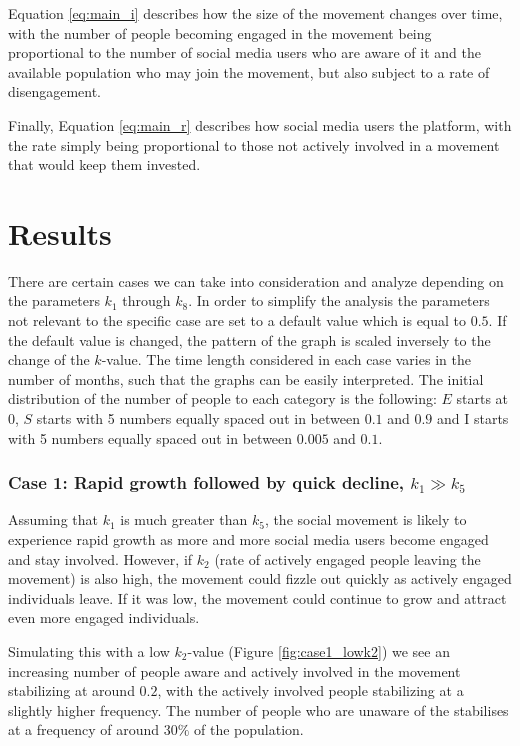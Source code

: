 \documentclass{article}
\begin{document}
    Equation \ref{eq:main_i} describes how the size of the movement changes over time, with the number of people becoming engaged in the movement being proportional to the number of social media users who are aware of it and the available population who may join the movement, but also subject to a rate of disengagement. 
    

    Finally, Equation \ref{eq:main_r} describes how social media users the platform, with the rate simply being proportional to those not actively involved in a movement that would keep them invested.
 

    \section{Results}
    
    There are certain cases we can take into consideration and analyze depending on the parameters $k_1$ through $k_8$. In order to simplify the analysis the parameters not relevant to the specific case are set to a default value which is equal to $0.5$. If the default value is changed, the pattern of the graph is scaled inversely to the change of the $k$-value.
    The time length considered in each case varies in the number of months, such that the graphs can be easily interpreted. The initial distribution of the number of people to each category is the following: $E$ starts at $0$, $S$ starts with 5 numbers equally spaced out in between $0.1$ and $0.9$ and I starts with 5 numbers equally spaced out in between $0.005$ and $0.1$.


    \subsubsection*{Case 1: Rapid growth followed by quick decline, $k_1 \gg k_5$} \normalfont
    Assuming that $k_1$  is much greater than $k_5$, the social movement is likely to experience rapid growth as more and more social media users become engaged and stay involved. However, if $k_2$ (rate of actively engaged people leaving the movement) is also high, the movement could fizzle out quickly as actively engaged individuals leave. If it was low, the movement could continue to grow and attract even more engaged individuals.

    Simulating this with a low $k_2$-value (Figure \ref{fig:case1_lowk2}) we see an increasing number of people aware and actively involved in the movement stabilizing at around $0.2$, with the actively involved people stabilizing at a slightly higher frequency. The number of people who are unaware of the stabilises at a frequency of around $30\%$ of the population.
    
\end{document}
